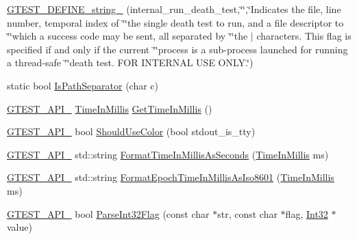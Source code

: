 \begin{DoxyCompactItemize}
\item 
\hyperlink{namespacetesting_1_1internal_a1b4d550272b7346726a5b4976d5c7aca}{G\+T\+E\+S\+T\+\_\+\+D\+E\+F\+I\+N\+E\+\_\+string\+\_\+} (internal\+\_\+run\+\_\+death\+\_\+test,\char`\"{}\char`\"{},\char`\"{}Indicates the file, line number, temporal index of \char`\"{}\char`\"{}the single death test to run, and a file descriptor to \char`\"{}\char`\"{}which a success code may be sent, all separated by \char`\"{}\char`\"{}the \textquotesingle{}$\vert$\textquotesingle{} characters.  This flag is specified if and only if the current \char`\"{}\char`\"{}process is a sub-\/process launched for running a thread-\/safe \char`\"{}\char`\"{}death test.  F\+OR I\+N\+T\+E\+R\+N\+AL U\+SE O\+N\+L\+Y.\char`\"{})
\item 
static bool \hyperlink{namespacetesting_1_1internal_a6b8d22cee9edbbfe56077420a6fa1cb1}{Is\+Path\+Separator} (char c)
\item 
\hyperlink{gtest-port_8h_aa73be6f0ba4a7456180a94904ce17790}{G\+T\+E\+S\+T\+\_\+\+A\+P\+I\+\_\+} \hyperlink{namespacetesting_1_1internal_a66a845df404b38fe85c5e14a069f255a}{Time\+In\+Millis} \hyperlink{namespacetesting_1_1internal_ae66b46943a429e6efb1db456d4cae90c}{Get\+Time\+In\+Millis} ()
\item 
\hyperlink{gtest-port_8h_aa73be6f0ba4a7456180a94904ce17790}{G\+T\+E\+S\+T\+\_\+\+A\+P\+I\+\_\+} bool \hyperlink{namespacetesting_1_1internal_ac1db1b4603967a6c4404f31cbbac31a6}{Should\+Use\+Color} (bool stdout\+\_\+is\+\_\+tty)
\item 
\hyperlink{gtest-port_8h_aa73be6f0ba4a7456180a94904ce17790}{G\+T\+E\+S\+T\+\_\+\+A\+P\+I\+\_\+} std\+::string \hyperlink{namespacetesting_1_1internal_a904485f27a54be8a5a92856e2d838797}{Format\+Time\+In\+Millis\+As\+Seconds} (\hyperlink{namespacetesting_1_1internal_a66a845df404b38fe85c5e14a069f255a}{Time\+In\+Millis} ms)
\item 
\hyperlink{gtest-port_8h_aa73be6f0ba4a7456180a94904ce17790}{G\+T\+E\+S\+T\+\_\+\+A\+P\+I\+\_\+} std\+::string \hyperlink{namespacetesting_1_1internal_a5ef227c4a610e7ff638b12dfb25b068e}{Format\+Epoch\+Time\+In\+Millis\+As\+Iso8601} (\hyperlink{namespacetesting_1_1internal_a66a845df404b38fe85c5e14a069f255a}{Time\+In\+Millis} ms)
\item 
\hyperlink{gtest-port_8h_aa73be6f0ba4a7456180a94904ce17790}{G\+T\+E\+S\+T\+\_\+\+A\+P\+I\+\_\+} bool \hyperlink{namespacetesting_1_1internal_ae3449e173767750b613114ceac6d916a}{Parse\+Int32\+Flag} (const char $\ast$str, const char $\ast$flag, \hyperlink{namespacetesting_1_1internal_a8ee38faaf875f133358abaf9bc056cec}{Int32} $\ast$value)

\end{DoxyCompactItemize}
